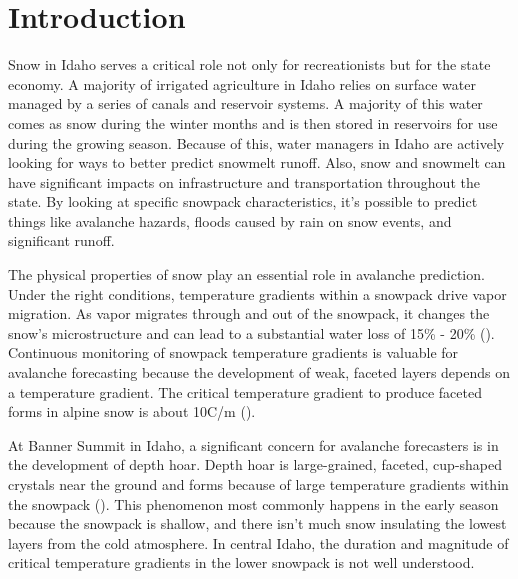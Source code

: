 \chapter{Introduction}
Snow in Idaho serves a critical role not only for recreationists but for the state economy. A majority of irrigated agriculture in Idaho relies on surface water managed by a series of canals and reservoir systems. A majority of this water comes as snow during the winter months and is then stored in reservoirs for use during the growing season. Because of this, water managers in Idaho are actively looking for ways to better predict snowmelt runoff. Also, snow and snowmelt can have significant impacts on infrastructure and transportation throughout the state. By looking at specific snowpack characteristics, it's possible to predict things like avalanche hazards, floods caused by rain on snow events, and significant runoff. 

The physical properties of snow play an essential role in avalanche prediction. Under the right conditions, temperature gradients within a snowpack drive vapor migration. As vapor migrates through and out of the snowpack, it changes the snow's microstructure and can lead to a substantial water loss of 15\% - 20\% (\cite{hood_williams_cline_1999, marks_dozier_1992, kattelmann_elder_1991}). Continuous monitoring of snowpack temperature gradients is valuable for avalanche forecasting because the development of weak, faceted layers depends on a temperature gradient. The critical temperature gradient to produce faceted forms in alpine snow is about 10\textdegree C/m (\cite{mcclung_schaerer_2009}). 

At Banner Summit in Idaho, a significant concern for avalanche forecasters is in the development of depth hoar. Depth hoar is large-grained, faceted, cup-shaped crystals near the ground and forms because of large temperature gradients within the snowpack (\cite{akitaya1974}). This phenomenon most commonly happens in the early season because the snowpack is shallow, and there isn't much snow insulating the lowest layers from the cold atmosphere. In central Idaho, the duration and magnitude of critical temperature gradients in the lower snowpack is not well understood. 

